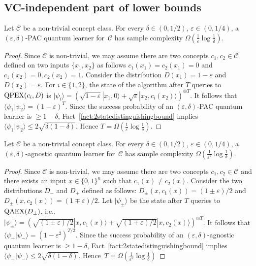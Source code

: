 \documentclass[twoside,11pt]{article}
\newcommand{\eps}{\varepsilon}
\newcommand{\ket}[1]{|#1\rangle}
\newcommand{\ip}[2]{\langle #1 | #2 \rangle}
\newcommand{\QPEX}{\mbox{\rm QPEX}}
\newcommand{\QAEX}{\mbox{\rm QAEX}}
\def\01{\{0,1\}}
\newcommand{\C}{\ensuremath{\mathscr{C}}}
\begin{document}
\subsection{VC-independent part of lower bounds}
\label{section:dindependentpart}
\begin{lemma} 
	\label{lemma:deltapartoflemmapac}
	Let $\C$ be a non-trivial concept class.
	For every $\delta\in (0,1/2)$, $\eps\in (0,1/4)$, a $(\eps,\delta)$-PAC quantum learner for~$\C$ has sample complexity $\Omega(\frac{1}{\eps}\log \frac{1}{\delta})$.
\end{lemma}

\begin{proof}
	Since $\C$ is non-trivial, we may assume there are two concepts $c_1,c_2 \in \C$ defined on two inputs $\{x_1,x_2\}$ as follows $c_1(x_1)=c_2(x_1)=0$ and $c_1(x_2)=0, c_2(x_2)=1$. Consider the distribution $D(x_1)=1-\eps$ and $D(x_2)=\eps$. For $i\in \{1,2\}$, the state of the algorithm after $T$ queries to $\QPEX(c_i,D)$ is $\ket{\psi_i}=(\sqrt{1-\eps}\ket{x_1,0}+\sqrt{\eps}\ket{x_2,c_i(x_2)})^{\otimes T}$. It follows that $\ip{\psi_1}{\psi_2}=(1-\eps)^{T}$. Since the success probability of an $(\eps,\delta)$-PAC quantum learner is $\geq 1-\delta$, Fact~\ref{fact:2statedistinguishingbound} implies $\ip{\psi_1}{\psi_2}\leq 2\sqrt{\delta(1-\delta)}$. Hence $T=\Omega(\frac{1}{\eps}\log \frac{1}{\delta})$.
\end{proof}

\begin{lemma}
	\label{lemma:deltapartoflemmaagnostic}
	Let $\C$ be a non-trivial concept class.
	For every $\delta\in (0,1/2)$, $\eps\in (0,1/4)$, a $(\eps,\delta)$-agnostic quantum learner for~$\C$ has sample complexity $\Omega(\frac{1}{\eps^2}\log \frac{1}{\delta})$.
\end{lemma}

\begin{proof}
	Since $\C$ is non-trivial, we may assume there are two concepts $c_1,c_2 \in \C$ and there exists an input $x\in \01^n$ such that $c_1(x)\neq c_2(x)$. Consider the two distributions $D_-$ and $D_+$ defined as follows: $D_{\pm}(x,c_1(x))=(1\pm \eps)/2$ and $D_{\pm}(x,c_2(x))=(1\mp \eps)/2$. Let $\ket{\psi_{\pm}}$ be the state after $T$ queries to $\QAEX(D_{\pm})$, i.e., $\ket{\psi_{\pm}}=(\sqrt{(1\pm \eps)/2}\ket{x,c_1(x)}+\sqrt{(1\mp \eps)/2}\ket{x,c_2(x)})^{\otimes T}$. It follows that $\ip{\psi_+}{\psi_-}=(1-\eps^2)^{T/2}$. 
	Since the success probability of an $(\eps,\delta)$-agnostic quantum learner is $\geq 1-\delta$, Fact~\ref{fact:2statedistinguishingbound} implies $\ip{\psi_+}{\psi_-}\leq 2\sqrt{\delta(1-\delta)}$. Hence~$T=\Omega(\frac{1}{\eps^2}\log \frac{1}{\delta})$ 
\end{proof}
\end{document}
